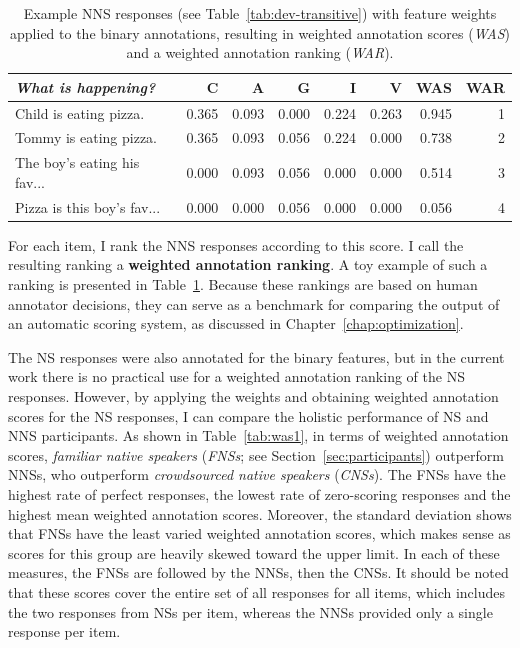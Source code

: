 \begin{table}[htb!]
\begin{center}
\begin{tabular}{|l||r|r|r|r|r||r|r|}
\hline
\textit{What is happening?} & C & A & G & I & V & WAS & WAR \\
\hline
\hline
Child is eating pizza. & 0.365 & 0.093 & 0.000 & 0.224 & 0.263 & 0.945 & 1 \\
\hline
Tommy is eating pizza. & 0.365 & 0.093 & 0.056 & 0.224 & 0.000 & 0.738 & 2 \\
\hline
The boy's eating his fav... & 0.000 & 0.093 & 0.056 & 0.000 & 0.000 & 0.514 & 3 \\
\hline
Pizza is this boy's fav... & 0.000 & 0.000 & 0.056 & 0.000 & 0.000 & 0.056 & 4 \\
\hline
\end{tabular}
\caption{\label{tab:applied-weights} Example NNS responses (see Table~\ref{tab:dev-transitive}) with feature weights applied to the binary annotations, resulting in weighted annotation scores (\textit{WAS}) and a weighted annotation ranking (\textit{WAR}).}
\end{center}
\end{table}

For each item, I rank the NNS responses according to this score. I call the resulting ranking a \textbf{weighted annotation ranking}. A toy example of such a ranking is presented in Table~\ref{tab:applied-weights}. Because these rankings are based on human annotator decisions, they can serve as a benchmark for comparing the output of an automatic scoring system, as discussed in Chapter~\ref{chap:optimization}.

The NS responses were also annotated for the binary features, but in the current work there is no practical use for a weighted annotation ranking of the NS responses. However, by applying the weights and obtaining weighted annotation scores for the NS responses, I can compare the holistic performance of NS and NNS participants. As shown in Table~\ref{tab:was1}, in terms of weighted annotation scores, \textit{familiar native speakers} (\textit{FNSs}; see Section~\ref{sec:participants}) outperform NNSs, who outperform \textit{crowdsourced native speakers} (\textit{CNSs}). The FNSs have the highest rate of perfect responses, the lowest rate of zero-scoring responses and the highest mean weighted annotation scores. Moreover, the standard deviation shows that FNSs have the least varied weighted annotation scores, which makes sense as scores for this group are heavily skewed toward the upper limit. In each of these measures, the FNSs are followed by the NNSs, then the CNSs. It should be noted that these scores cover the entire set of all responses for all items, which includes the two responses from NSs per item, whereas the NNSs provided only a single response per item.



